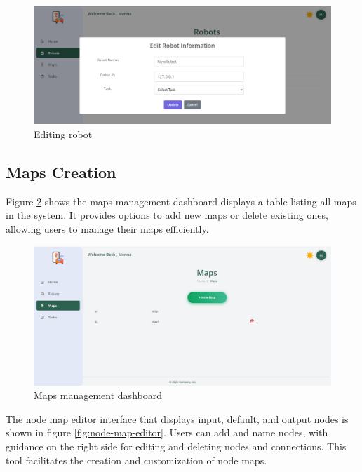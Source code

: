     \begin{figure}[h!]
        \centering
        \includegraphics[scale=0.31]{Figures/WebApp/editRobot.png}
        \caption{Editing robot}
        \label{fig:edit-robot}
    \end{figure}

\vspace{-3mm}
\newpage
\subsection{Maps Creation}

    Figure \ref{fig:maps-management} shows the maps management dashboard displays a table listing all maps in the system. It provides options to add new maps or delete existing ones, allowing users to manage their maps efficiently.

    \begin{figure}[h!]
        \centering
        \includegraphics[scale=0.4]{Figures/WebApp/mapsCreation.png}
        \caption{Maps management dashboard}
        \label{fig:maps-management}
    \end{figure}




    The node map editor interface that displays input, default, and output nodes is shown in figure \ref{fig:node-map-editor}. Users can add and name nodes, with guidance on the right side for editing and deleting nodes and connections. This tool facilitates the creation and customization of node maps.


